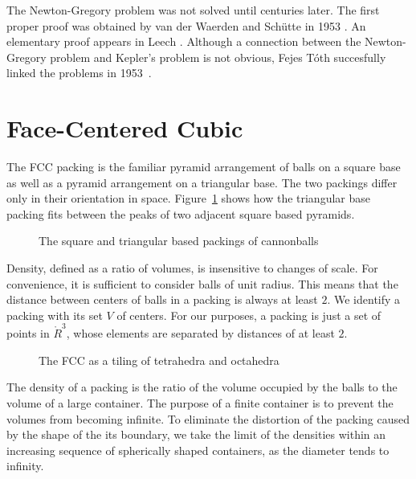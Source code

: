 The Newton-Gregory problem was not solved until centuries later.
The first proper proof was obtained by van der Waerden and
Sch\"utte in 1953 \cite{Sch53}.  An elementary proof appears in Leech
\cite{Leech:1956:MG}.  Although a connection between the Newton-Gregory
problem and Kepler's problem is not obvious, Fejes T\'oth succesfully linked the
problems in 1953~\cite{Fej53}.


\section{Face-Centered Cubic}



The FCC packing is the familiar pyramid arrangement of
balls on a square base as well as a pyramid arrangement on a
triangular base.  The two packings
differ only in their orientation in space.
Figure~\ref{fig:tri-square-cannonballs} shows how the triangular base
packing fits between the peaks of two adjacent square based pyramids.

\begin{figure}[htb]
  \centering
  \caption{The square and triangular based packings of cannonballs}
  \label{fig:tri-square-cannonballs}
\end{figure}

Density, defined as a ratio of volumes, is insensitive to changes of
scale.  For convenience, it is sufficient to consider balls of unit
radius. This means that the distance between centers of balls in a
packing is always  at least $2$.  We identify a packing with its set $V$
of centers.   For our purposes, a packing is just a set of points
in $\ring{R}^3$, whose elements are separated by distances of at least
$2$.


\begin{figure}[htb]
  \centering
  \caption{The FCC as a tiling of tetrahedra and octahedra}
  \label{fig:tet-oct}
\end{figure}

The density of a packing is the ratio of the volume occupied by the
balls to the volume of a large container.  The
purpose of a finite container is to prevent the volumes from becoming
infinite.  To eliminate the distortion of the packing caused by the
shape of the its boundary, we take the limit of the densities within an increasing
sequence of spherically shaped containers, as the diameter tends to infinity.

